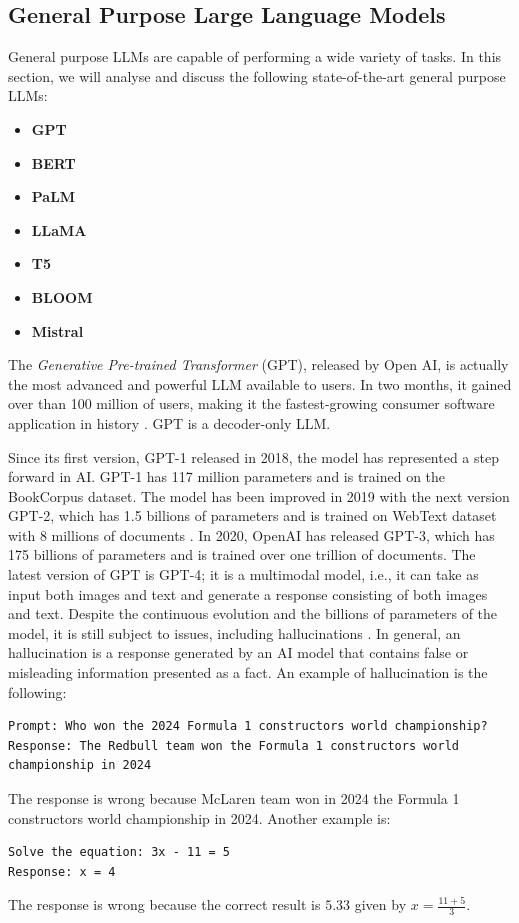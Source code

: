 \subsection{General Purpose Large Language Models}
General purpose LLMs are capable of performing a wide variety of tasks.
In this section, we will analyse and discuss the following state-of-the-art general purpose LLMs:
\begin{itemize}
    \item \textbf{GPT}
    \item \textbf{BERT}
    \item \textbf{PaLM}
    \item \textbf{LLaMA}
    \item \textbf{T5}
    \item \textbf{BLOOM}
    \item \textbf{Mistral}
\end{itemize}

The \textit{Generative Pre-trained Transformer} (GPT), released by Open AI, is actually the most advanced and powerful LLM available to users.
In two months, it gained over than 100 million of users, making it the fastest-growing consumer software application in history \cite{achiam2023gpt}.
GPT is a decoder-only LLM.

Since its first version, GPT-1 released in 2018, the model has represented a step forward in AI.
GPT-1 has 117 million parameters and is trained on the BookCorpus dataset.
The model has been improved in 2019 with the next version GPT-2, which has 1.5 billions of parameters and is trained on WebText dataset with 8 millions of documents \cite{radford2019language}.
In 2020, OpenAI has released GPT-3, which has 175 billions of parameters and is trained over one trillion of documents.
The latest version of GPT is GPT-4; it is a multimodal model, i.e., it can take as input both images and text and generate a response consisting of both images and text.
Despite the continuous evolution and the billions of parameters of the model, it is still subject to issues, including hallucinations \cite{achiam2023gpt}.
In general, an hallucination is a response generated by an AI model that contains false or misleading information presented as a fact. An example of hallucination is the following:
\begin{lstlisting}
Prompt: Who won the 2024 Formula 1 constructors world championship?
Response: The Redbull team won the Formula 1 constructors world championship in 2024
\end{lstlisting}
The response is wrong because McLaren team won in 2024 the Formula 1 constructors world championship in 2024.
Another example is:
\begin{lstlisting}
Solve the equation: 3x - 11 = 5
Response: x = 4
\end{lstlisting}
The response is wrong because the correct result is $5.33$ given by $x = \frac{11+5}{3}$.

